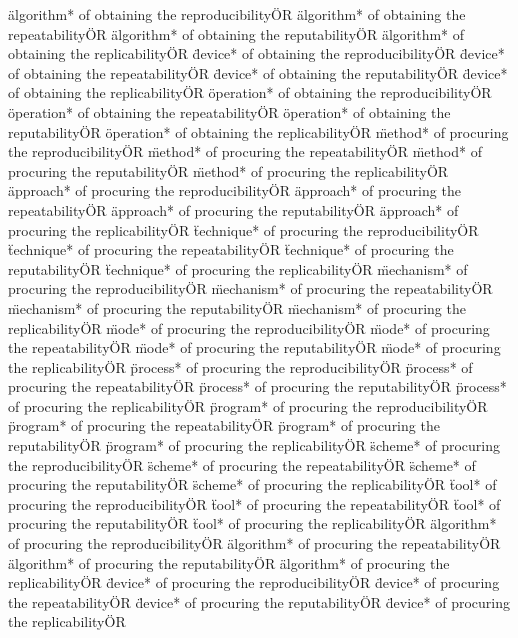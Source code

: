 \documentclass[
10pt, %
a4paper, %
oneside, %
headinclude,footinclude, %
BCOR5mm, %
]{scrartcl}
\begin{document}
\"algorithm* of obtaining the reproducibility\" OR \"algorithm* of obtaining the repeatability\" OR \"algorithm* of obtaining the reputability\" OR \"algorithm* of obtaining the replicability\" OR 
\"device* of obtaining the reproducibility\" OR \"device* of obtaining the repeatability\" OR \"device* of obtaining the reputability\" OR \"device* of obtaining the replicability\" OR 
\"operation* of obtaining the reproducibility\" OR \"operation* of obtaining the repeatability\" OR \"operation* of obtaining the reputability\" OR \"operation* of obtaining the replicability\" OR 
\"method* of procuring the reproducibility\" OR \"method* of procuring the repeatability\" OR \"method* of procuring the reputability\" OR \"method* of procuring the replicability\" OR 
\"approach* of procuring the reproducibility\" OR \"approach* of procuring the repeatability\" OR \"approach* of procuring the reputability\" OR \"approach* of procuring the replicability\" OR 
\"technique* of procuring the reproducibility\" OR \"technique* of procuring the repeatability\" OR \"technique* of procuring the reputability\" OR \"technique* of procuring the replicability\" OR 
\"mechanism* of procuring the reproducibility\" OR \"mechanism* of procuring the repeatability\" OR \"mechanism* of procuring the reputability\" OR \"mechanism* of procuring the replicability\" OR 
\"mode* of procuring the reproducibility\" OR \"mode* of procuring the repeatability\" OR \"mode* of procuring the reputability\" OR \"mode* of procuring the replicability\" OR 
\"process* of procuring the reproducibility\" OR \"process* of procuring the repeatability\" OR \"process* of procuring the reputability\" OR \"process* of procuring the replicability\" OR 
\"program* of procuring the reproducibility\" OR \"program* of procuring the repeatability\" OR \"program* of procuring the reputability\" OR \"program* of procuring the replicability\" OR 
\"scheme* of procuring the reproducibility\" OR \"scheme* of procuring the repeatability\" OR \"scheme* of procuring the reputability\" OR \"scheme* of procuring the replicability\" OR 
\"tool* of procuring the reproducibility\" OR \"tool* of procuring the repeatability\" OR \"tool* of procuring the reputability\" OR \"tool* of procuring the replicability\" OR 
\"algorithm* of procuring the reproducibility\" OR \"algorithm* of procuring the repeatability\" OR \"algorithm* of procuring the reputability\" OR \"algorithm* of procuring the replicability\" OR 
\"device* of procuring the reproducibility\" OR \"device* of procuring the repeatability\" OR \"device* of procuring the reputability\" OR \"device* of procuring the replicability\" OR 
\end{document}

